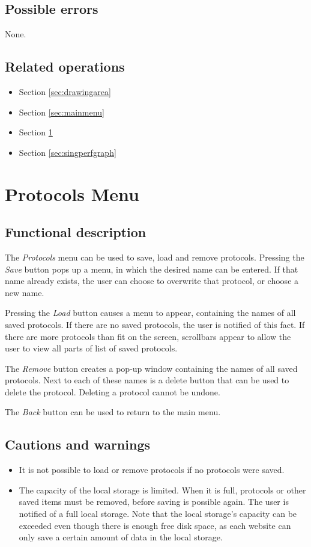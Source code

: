   \subsection*{Possible errors}
  None.

  \subsection*{Related operations}
  \begin{itemize}
    \item Section \ref{sec:drawingarea}
    \item Section \ref{sec:mainmenu}
    \item Section \ref{sec:protmenu}
    \item Section \ref{sec:singperfgraph}
  \end{itemize}

\section{Protocols Menu}\label{sec:protmenu}
  \subsection*{Functional description}
  The \emph{Protocols} menu can be used to save, load and remove protocols. Pressing the \emph{Save} button pops up a menu, in which the desired name can be entered. If that name already exists, the user can choose to overwrite that protocol, or choose a new name.
  
  Pressing the \emph{Load} button causes a menu to appear, containing the names of all saved protocols. If there are no saved protocols, the user is notified of this fact. If there are more protocols than fit on the screen, scrollbars appear to allow the user to view all parts of list of saved protocols.
  
  The \emph{Remove} button creates a pop-up window containing the names of all saved protocols. Next to each of these names is a delete button that can be used to delete the protocol. Deleting a protocol cannot be undone.
  
  The \emph{Back} button can be used to return to the main menu.

  \subsection*{Cautions and warnings}
  \begin{itemize}
    \item It is not possible to load or remove protocols if no protocols were saved.
    \item The capacity of the local storage is limited. When it is full, protocols or other saved \projectname{} items must be removed, before saving is possible again. The user is notified of a full local storage. Note that the local storage's capacity can be exceeded even though there is enough free disk space, as each website can only save a certain amount of data in the local storage.
  \end{itemize}  

